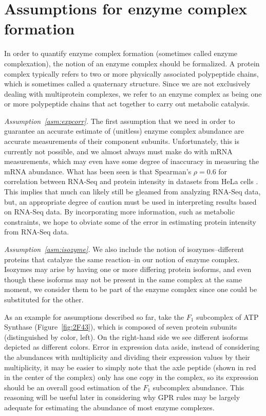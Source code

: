\section{Assumptions for enzyme complex formation}
\label{sec:complexation}

In order to quantify enzyme complex formation (sometimes called enzyme
complexation), the notion of an enzyme complex should be formalized.
A protein complex typically refers to two or more physically
associated polypeptide chains, which is sometimes called a quaternary
structure. Since we are not exclusively dealing with multiprotein
complexes, we refer to an enzyme complex as being one or more
polypeptide chains that act together to carry out metabolic
catalysis.

\emph{Assumption~\ref{asm:expcorr}.}  The first assumption that we
need in order to guarantee an accurate estimate of (unitless) enzyme
complex abundance are accurate measurements of their component
subunits. Unfortunately, this is currently not possible, and we almost
always must make do with mRNA measurements, which may even have some
degree of inaccuracy in measuring the mRNA abundance. What has been
seen is that Spearman's $\rho = 0.6$ for correlation between RNA-Seq
and protein intensity in datasets from HeLa cells
\citep{Nagaraj2011}. This implies that much can likely still be
gleamed from analyzing RNA-Seq data, but, an appropriate degree of
caution must be used in interpreting results based on RNA-Seq data. By
incorporating more information, such as metabolic constraints, we hope
to obviate some of the error in estimating protein intensity from
RNA-Seq data. 

\emph{Assumption~\ref{asm:isozyme}.} We also include the notion of
isozymes--different proteins that catalyze the same reaction--in our
notion of enzyme complex. Isozymes may arise by having one or more
differing protein isoforms, and even though these isoforms may not be
present in the same complex at the same moment, we consider them to be
part of the enzyme complex since one could be substituted for the
other.

As an example for assumptions described so far, take the $F_1$
subcomplex of ATP Synthase (Figure~\ref{fig:2F43}), which is composed
of seven protein subunits (distinguished by color, left). On the
right-hand side we see different isoforms depicted as different
colors.  Error in expression data aside, instead of considering the
abundances with multiplicity and dividing their expression values by
their multiplicity, it may be easier to simply note that the axle
peptide (shown in red in the center of the complex) only has one copy
in the complex, so its expression should be an overall good estimation
of the $F_1$ subcomplex abundance. This reasoning will be useful
later in considering why GPR rules may be largely adequate for estimating
the abundance of most enzyme complexes.

